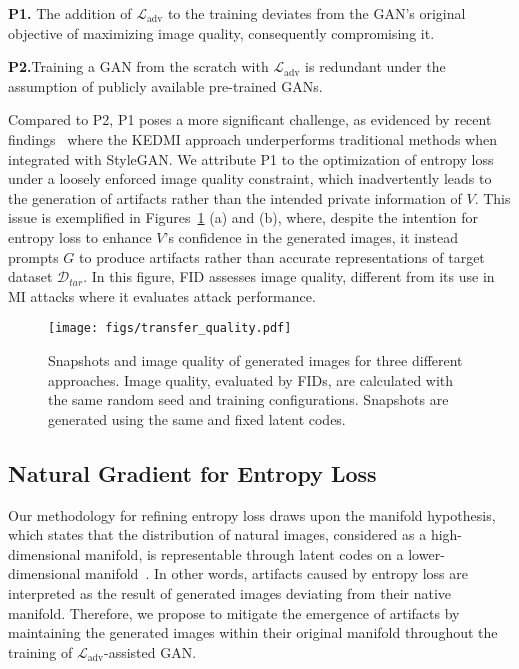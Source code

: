 \noindent
\textbf{P1.}\quad
The addition of $\mathcal{L}_{\text{adv}}$ to the training deviates from the GAN's original objective of maximizing image quality, consequently compromising it.

\noindent
\textbf{P2.}\quad Training a GAN from the scratch with $\mathcal{L}_{\text{adv}}$ is redundant under the assumption of publicly available pre-trained GANs.

Compared to P2, P1 poses a more significant challenge, as evidenced by recent findings~\cite{ppa22icml} where the KEDMI approach underperforms traditional methods when integrated with StyleGAN.
We attribute P1 to the optimization of entropy loss under a loosely enforced image quality constraint, which inadvertently leads to the generation of artifacts rather than the intended private information of $V$.
This issue is exemplified in Figures~\ref{fig:transfer_quality} (a) and (b), where, despite the intention for entropy loss to enhance $V$'s confidence in the generated images, it instead prompts $G$ to produce artifacts rather than accurate representations of target dataset $\mathcal{D}_{tar}$.
In this figure, FID assesses image quality, different from its use in MI attacks where it evaluates attack performance.

\begin{figure}[htb]%
	\centering
	\texttt{[image: figs/transfer\_quality.pdf]}
	\caption{Snapshots and image quality of generated images for three different approaches. Image quality, evaluated by FIDs, are calculated with the same random seed and training configurations. Snapshots are generated using the same and fixed latent codes.}
	\label{fig:transfer_quality}
 \vspace{-0.1in}
\end{figure}

\subsection{Natural Gradient for Entropy Loss}
\label{sec:gan_aug:ngd}
Our methodology for refining entropy loss draws upon the manifold hypothesis, which states that the distribution of natural images, considered as a high-dimensional manifold, is representable through latent codes on a lower-dimensional manifold~\cite{ml16goodfellow,rogan18cvpr}.
In other words, artifacts caused by entropy loss are interpreted as the result of generated images deviating from their native manifold.
Therefore, we propose to mitigate the emergence of artifacts by maintaining the generated images within their original manifold throughout the training of $\mathcal{L}_{\text{adv}}$-assisted GAN.

